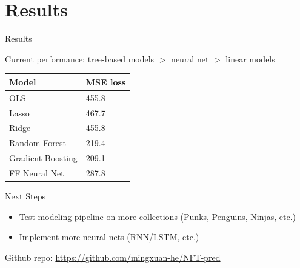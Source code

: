 \documentclass{beamer}
\begin{document}
\section{Results}

\begin{frame}{Results}
    
    Current performance: tree-based models $>$ neural net $>$ linear models

\begin{table}
    \centering
    \begin{tabular}{|p{8em}|p{8em}|}
        \hline
        \textbf{Model} & \textbf{MSE loss} \\ \hline
        OLS            & 455.8       \\ \hline
        Lasso          & 467.7      \\ \hline
        Ridge          & 455.8       \\ \hline
        Random Forest  & 219.4         \\ \hline
        Gradient Boosting & 209.1       \\ \hline
        FF Neural Net  & 287.8         \\ \hline
    \end{tabular}
\end{table}
\end{frame}


\begin{frame}{Next Steps}
\begin{itemize}
    \item Test modeling pipeline on more collections (Punks, Penguins, Ninjas, etc.)
    \item Implement more neural nets (RNN/LSTM, etc.)
\end{itemize}

\bigskip
Github repo: \url{https://github.com/mingxuan-he/NFT-pred}

\end{frame}
\end{document}
